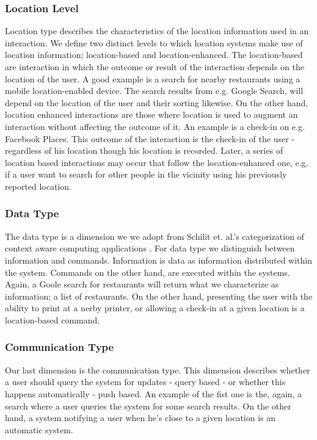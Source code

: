 \subsubsection{Location Level}
Location type describes the characteristics of the location information used in an interaction. We define two distinct levels to which location systems make use of location information; location-based and location-enhanced. The location-based are interaction in which the outcome or result of the interaction depends on the location of the user. A good example is a search for nearby restaurants using a mobile location-enabled device. The search results from e.g. Google Search, will depend on the location of the user and their sorting likewise. On the other hand, location enhanced interactions are those where location is used to augment an interaction without affecting the outcome of it. An example is a check-in on e.g. Facebook Places. This outcome of the interaction is the check-in of the user - regardless of his location though his location is recorded. Later, a series of location based interactions may occur that follow the location-enhanced one, e.g. if a user want to search for other people in the vicinity using his previously reported location.

\subsubsection{Data Type}
The data type is a dimension we we adopt from Schilit et. al.'s categorization of context aware computing applications \cite{512740}. For data type we distinguish between information and commands. Information is data as information distributed within the system. Commands on the other hand, are executed within the systems. Again, a Goole search for restaurants will return what we characterize as information; a list of restaurants. On the other hand, presenting the user with the ability to print at a nerby printer, or allowing a check-in at a given location is a location-based command.

\subsubsection{Communication Type}
\label{sub:communication.type}
Our last dimension is the communication type. This dimension describes whether a user should query the system for updates - query based -  or whether this happens automatically - push based. An example of the fist one is the, again, a search where a user queries the system for some search results. On the other hand, a system notifying a user when he's close to a given location is an automatic system.  

